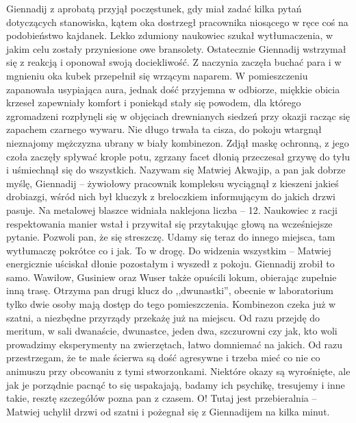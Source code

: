\documentclass[../MAIN.tex]{subfiles}
\begin{document}
\qd
Giennadij z aprobatą przyjął poczęstunek, gdy miał zadać kilka pytań dotyczących stanowiska, kątem oka dostrzegł pracownika niosącego w ręce coś na podobieństwo kajdanek. Lekko zdumiony naukowiec szukał wytłumaczenia, w jakim celu zostały przyniesione owe bransolety. Ostatecznie Giennadij wstrzymał się z reakcją i oponował swoją dociekliwość. Z naczynia zaczęła buchać para i w mgnieniu oka kubek przepełnił się wrzącym naparem. W pomieszczeniu zapanowała usypiająca aura, jednak dość przyjemna w odbiorze, miękkie obicia krzeseł zapewniały komfort i poniekąd stały się powodem, dla którego zgromadzeni rozpłynęli się w objęciach drewnianych siedzeń przy okazji racząc się zapachem czarnego wywaru. Nie długo trwała ta cisza, do pokoju wtargnął nieznajomy mężczyzna ubrany w biały kombinezon. Zdjął maskę ochronną, z jego czoła zaczęły spływać krople potu, zgrzany facet dłonią przeczesał grzywę do tyłu i uśmiechnął się do wszystkich.
% 
\sx Nazywam się Matwiej Akwajip, a pan jak dobrze myślę, Giennadij -- żywiołowy pracownik kompleksu wyciągnął z kieszeni jakieś drobiazgi, wśród nich był kluczyk z breloczkiem informującym do jakich drzwi pasuje. Na metalowej blaszce widniała naklejona liczba -- 12. Naukowiec z racji respektowania manier wstał i przywitał się przytakując głową na wcześniejsze pytanie. 
\xx Pozwoli pan, że się streszczę. Udamy się teraz do innego miejsca, tam wytłumaczę pokrótce co i jak. To w drogę. Do widzenia wszystkim -- Matwiej energicznie uściskał dłonie pozostałym i wyszedł z pokoju. 
\qd
Giennadij zrobił to samo. Wawiłow, Gusiniew oraz Wuser także opuścili lokum, obierając zupełnie inną trasę. 
\sx Otrzyma pan drugi klucz do ,,dwunastki'', obecnie w laboratorium tylko dwie osoby mają dostęp do tego pomieszczenia. Kombinezon czeka już w szatni, a niezbędne przyrządy przekażę już na miejscu. Od razu przejdę do meritum, w sali dwanaście, dwunastce, jeden dwa, szczurowni czy jak, kto woli prowadzimy eksperymenty na zwierzętach, łatwo domniemać na jakich. Od razu przestrzegam, że te małe ścierwa są dość agresywne i trzeba mieć co nie co animuszu przy obcowaniu z tymi stworzonkami. Niektóre okazy są wyrośnięte, ale jak je porządnie pacnąć to się uspakajają, badamy ich psychikę, tresujemy i inne takie, resztę szczegółów pozna pan z czasem. O! Tutaj jest przebieralnia -- Matwiej uchylił drzwi od szatni i pożegnał się z Giennadijem na kilka minut. 
\qd
\end{document}
